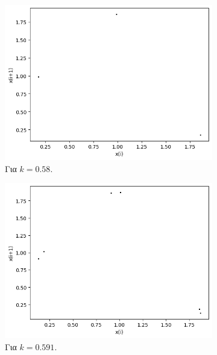 \begin{figure}[h!]
\begin{subfigure}[c]{0.4\textwidth}
		\includegraphics[width=\textwidth]{LateX images/graphs q05/g9}
		\caption{Για $k=0.58$.}
		\label{f:k33}
	\end{subfigure}
	\hfill
	\begin{subfigure}[c]{0.4\textwidth}
		\centering
		\includegraphics[width=\textwidth]{LateX images/graphs q05/g10}
		\caption{Για $k=0.591$.}
		\label{f:k35}
	\end{subfigure}
	\hfill
	\begin{subfigure}[b]{0.4\textwidth}
		\centering

\end{subfigure}
\end{figure}

